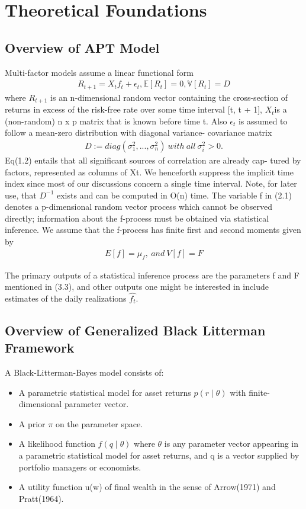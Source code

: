 \documentclass[12pt]{article}
\numberwithin{equation}{section}
\begin{document}
\section{Theoretical Foundations}
\subsection{Overview of APT Model}

Multi-factor models assume a linear functional form
\begin{align} 
R_{t+1} = X_t f_t +\epsilon_t, \mathbb{E}[R_t]=0, \mathbb{V} [R_t]=D 
\end{align}
where $R_{t+1} $ is an n-dimensional random vector containing the cross-section of returns in excess of the risk-free rate over some time interval [t, t + 1], $X_t $is a (non-random) n x p matrix that is known before time t. Also $\epsilon_t$ is assumed to follow a mean-zero distribution with diagonal variance- covariance matrix
\begin{align} 
D := diag( \sigma_1^2,...,\sigma_n^2) \ with \  all \   \sigma_i^2 > 0.
\end{align}
Eq(1.2) entails that all significant sources of correlation are already cap- tured by factors, represented as columns of Xt. We henceforth suppress the implicit time index since most of our discussions concern a single time interval. Note, for later use, that $D^{-1}$ exists and can be computed in O(n) time.
The variable f in (2.1) denotes a p-dimensional random vector process which cannot be observed directly; information about the f-process must be obtained via statistical inference. We assume that the f-process has finite first and second moments given by
\begin{align} 
E[f] = \mu_f, \ and \ V[f] = F 
\end{align}

The primary outputs of a statistical inference process are the parameters
f and F mentioned in (3.3), and other outputs one might be interested in
include estimates of the daily realizations $\hat {f_t}$.

\subsection{Overview of Generalized Black Litterman Framework}

A Black-Litterman-Bayes model consists of:
\begin{itemize}
  \item  A parametric statistical model for asset returns $p(r\mid\theta)$ with finite-dimensional parameter vector.
  \item  A prior $ \pi $ on the parameter space.
  \item  A likelihood function $f(q\mid\theta)$ where $\theta$ is any parameter vector appearing in a parametric statistical model for asset returns, and q is a vector supplied by portfolio managers or economists.
  \item  A utility function u(w) of final wealth in the sense of Arrow(1971) and Pratt(1964).
\end{itemize}
\end{document}
